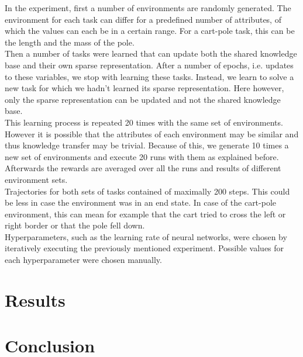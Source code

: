 \documentclass[a4paper]{article}
\begin{document}
In the experiment, first a number of environments are randomly generated. The environment for each task can differ for a predefined number of attributes, of which the values can each be in a certain range. For a cart-pole task, this can be the length and the mass of the pole.\\
Then a number of tasks were learned that can update both the shared knowledge base and their own sparse representation. After a number of epochs, i.e. updates to these variables, we stop with learning these tasks. Instead, we learn to solve a new task for which we hadn't learned its sparse representation. Here however, only the sparse representation can be updated and not the shared knowledge base.\\
This learning process is repeated 20 times with the same set of environments. However it is possible that the attributes of each environment may be similar and thus knowledge transfer may be trivial. Because of this, we generate 10 times a new set of environments and execute 20 runs with them as explained before.\\
Afterwards the rewards are averaged over all the runs and results of different environment sets.\\
Trajectories for both sets of tasks contained of maximally 200 steps. This could be less in case the environment was in an end state. In case of the cart-pole environment, this can mean for example that the cart tried to cross the left or right border or that the pole fell down.\\
Hyperparameters, such as the learning rate of neural networks, were chosen by iteratively executing the previously mentioned experiment. Possible values for each hyperparameter were chosen manually.
\section{Results}
\section{Conclusion}



\end{document}
